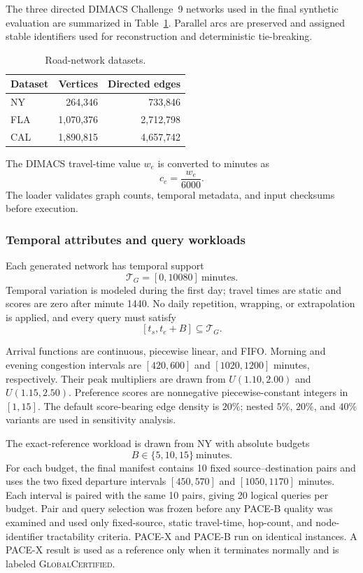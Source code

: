\documentclass[a4paper,fleqn]{cas-dc}
\begin{document}
The three directed DIMACS Challenge~9 networks used in the final synthetic evaluation are summarized in Table~\ref{tab:exp_datasets}. Parallel arcs are preserved and assigned stable identifiers used for reconstruction and deterministic tie-breaking.

\begin{table}[t]
\centering
\caption{Road-network datasets.}
\label{tab:exp_datasets}
\footnotesize
\setlength{\tabcolsep}{4pt}
\begin{tabular}{@{}lrr@{}}
\toprule
\textbf{Dataset} & \textbf{Vertices} & \textbf{Directed edges} \\
\midrule
NY  & 264,346    & 733,846 \\
FLA & 1,070,376  & 2,712,798 \\
CAL & 1,890,815  & 4,657,742 \\
\bottomrule
\end{tabular}
\end{table}

The DIMACS travel-time value \(w_e\) is converted to minutes as
\[
c_e=\frac{w_e}{6000}.
\]
The loader validates graph counts, temporal metadata, and input checksums before execution.

\subsubsection{Temporal attributes and query workloads}

Each generated network has temporal support
\[
\mathcal T_G=[0,10080]\ \text{minutes}.
\]
Temporal variation is modeled during the first day; travel times are static and scores are zero after minute 1440. No daily repetition, wrapping, or extrapolation is applied, and every query must satisfy
\[
[t_s,t_e+B]\subseteq\mathcal T_G.
\]

Arrival functions are continuous, piecewise linear, and FIFO. Morning and evening congestion intervals are \([420,600]\) and \([1020,1200]\) minutes, respectively. Their peak multipliers are drawn from \(U(1.10,2.00)\) and \(U(1.15,2.50)\). Preference scores are nonnegative piecewise-constant integers in \([1,15]\). The default score-bearing edge density is \(20\%\); nested \(5\%\), \(20\%\), and \(40\%\) variants are used in sensitivity analysis.

The exact-reference workload is drawn from NY with absolute budgets
\[
B\in\{5,10,15\}\ \text{minutes}.
\]
For each budget, the final manifest contains 10 fixed source--destination pairs and uses the two fixed departure intervals \([450,570]\) and \([1050,1170]\) minutes. Each interval is paired with the same 10 pairs, giving 20 logical queries per budget. Pair and query selection was frozen before any PACE-B quality was examined and used only fixed-source, static travel-time, hop-count, and node-identifier tractability criteria. PACE-X and PACE-B run on identical instances. A PACE-X result is used as a reference only when it terminates normally and is labeled \textsc{GlobalCertified}.
\end{document}

